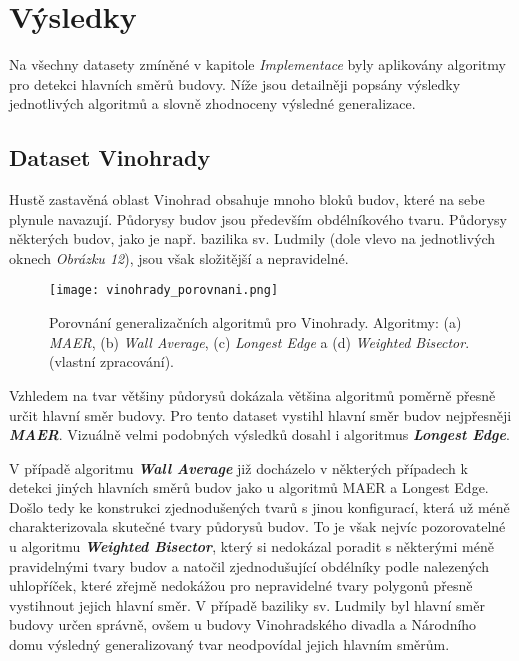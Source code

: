 \chapter*{Výsledky}

\par Na všechny datasety zmíněné v kapitole \emph{Implementace} byly aplikovány algoritmy pro detekci hlavních směrů budovy. Níže jsou detailněji popsány výsledky jednotlivých algoritmů a slovně zhodnoceny výsledné generalizace.

\section*{Dataset Vinohrady}

\par Hustě zastavěná oblast Vinohrad obsahuje mnoho bloků budov, které na sebe plynule navazují. Půdorysy budov jsou především obdélníkového tvaru. Půdorysy některých budov, jako je např. bazilika sv. Ludmily (dole vlevo na jednotlivých oknech \emph{Obrázku 12}), jsou však složitější a nepravidelné.


\begin{figure}[h]
\centering
\texttt{[image: vinohrady\_porovnani.png]}
    \caption{Porovnání generalizačních algoritmů pro Vinohrady. Algoritmy: (a) \emph{MAER}, (b) \emph{Wall Average}, (c) \emph{Longest Edge} a (d) \emph{Weighted Bisector}. (vlastní zpracování).}
\end{figure}

\par Vzhledem na tvar většiny půdorysů dokázala většina algoritmů poměrně přesně určit hlavní směr budovy. Pro tento dataset vystihl hlavní směr budov nejpřesněji \textbf{\emph{MAER}}. Vizuálně velmi podobných výsledků dosahl i algoritmus \textbf{\emph{Longest Edge}}.
\par V případě algoritmu \textbf{\emph{Wall Average}} již docházelo v některých případech k detekci jiných hlavních směrů budov jako u algoritmů MAER a Longest Edge. Došlo tedy ke konstrukci zjednodušených tvarů s jinou konfigurací, která už méně charakterizovala skutečné tvary půdorysů budov. To je však nejvíc pozorovatelné u algoritmu \textbf{\emph{Weighted Bisector}}, který si nedokázal poradit s některými méně pravidelnými tvary budov a natočil zjednodušující obdélníky podle nalezených uhlopříček, které zřejmě nedokážou pro nepravidelné tvary polygonů přesně vystihnout jejich hlavní směr. V případě baziliky sv. Ludmily byl hlavní směr budovy určen správně, ovšem u budovy Vinohradského divadla a Národního domu výsledný generalizovaný tvar neodpovídal jejich hlavním směrům. 


